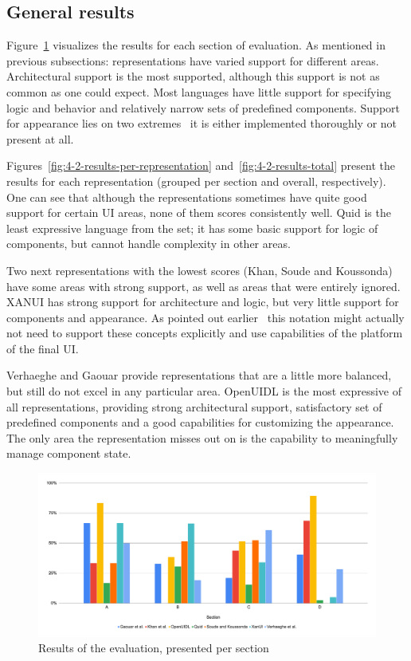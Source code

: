 \subsection{General results}\label{subsec:general-results}

Figure~\ref{fig:4-2-results-per-section} visualizes the results for each section of evaluation.
As mentioned in previous subsections: representations have varied support for different areas.
Architectural support is the most supported, although this support is not as common as one could expect.
Most languages have little support for specifying logic and behavior and relatively narrow sets of predefined components.
Support for appearance lies on two extremes \textendash\ it is either implemented thoroughly or not present at all.

Figures~\ref{fig:4-2-results-per-representation} and~\ref{fig:4-2-results-total} present the results for each representation (grouped per section and overall, respectively).
One can see that although the representations sometimes have quite good support for certain UI areas, none of them scores consistently well.
Quid is the least expressive language from the set;
it has some basic support for logic of components, but cannot handle complexity in other areas.

Two next representations with the lowest scores (Khan, Soude and Koussonda) have some areas with strong support, as well as areas that were entirely ignored.
XANUI has strong support for architecture and logic, but very little support for components and appearance.
As pointed out earlier \textendash\ this notation might actually not need to support these concepts explicitly and use capabilities of the platform of the final UI.

Verhaeghe and Gaouar provide representations that are a little more balanced, but still do not excel in any particular area.
OpenUIDL is the most expressive of all representations, providing strong architectural support, satisfactory set of predefined components and a good capabilities for customizing the appearance.
The only area the representation misses out on is the capability to meaningfully manage component state.

\begin{figure}
    \centering
    \includegraphics[width=\textwidth]{4-results-and-discussion/results-per-section}
    \caption{Results of the evaluation, presented per section}
    \label{fig:4-2-results-per-section}
\end{figure}

